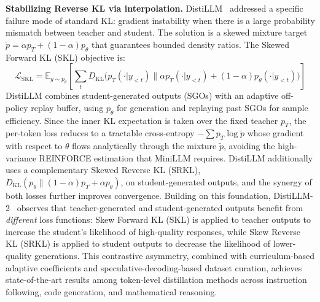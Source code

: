 \documentclass{article} %
\newcommand{\KL}{D_{\mathrm{KL}}}
\newcommand{\ptheta}{p_\theta}
\newcommand{\pteacher}{p_T}
\begin{document}
\textbf{Stabilizing Reverse KL via interpolation.}
DistiLLM~\citep{2402.03898} addressed a specific failure mode of standard KL: gradient instability when there is a large probability mismatch between teacher and student. The solution is a skewed mixture target $\tilde{p} = \alpha \pteacher + (1{-}\alpha)\ptheta$ that guarantees bounded density ratios. The Skewed Forward KL (SKL) objective is:
\begin{equation}
    \mathcal{L}_{\text{SKL}} = \mathbb{E}_{y \sim \ptheta} \left[ \sum_t \KL\big(\pteacher(\cdot|y_{<t}) \parallel \alpha \pteacher(\cdot|y_{<t}) + (1{-}\alpha) \ptheta(\cdot|y_{<t})\big) \right]
    \label{eq:distillm}
\end{equation}
DistiLLM combines student-generated outputs (SGOs) with an adaptive off-policy replay buffer, using $\ptheta$ for generation and replaying past SGOs for sample efficiency. Since the inner KL expectation is taken over the fixed teacher $\pteacher$, the per-token loss reduces to a tractable cross-entropy $-\sum \pteacher \log \tilde{p}$ whose gradient with respect to $\theta$ flows analytically through the mixture $\tilde{p}$, avoiding the high-variance REINFORCE estimation that MiniLLM requires. DistiLLM additionally uses a complementary Skewed Reverse KL (SRKL), $\KL(\ptheta \| (1{-}\alpha)\pteacher + \alpha\ptheta)$, on student-generated outputs, and the synergy of both losses further improves convergence. Building on this foundation, DistiLLM-2~\citep{2503.07067} observes that teacher-generated and student-generated outputs benefit from \emph{different} loss functions: Skew Forward KL (SKL) is applied to teacher outputs to increase the student's likelihood of high-quality responses, while Skew Reverse KL (SRKL) is applied to student outputs to decrease the likelihood of lower-quality generations. This contrastive asymmetry, combined with curriculum-based adaptive coefficients and speculative-decoding-based dataset curation, achieves state-of-the-art results among token-level distillation methods across instruction following, code generation, and mathematical reasoning.
\end{document}
